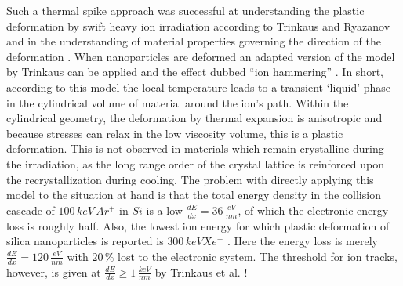 Such a thermal spike approach was successful at understanding the plastic deformation by swift heavy ion irradiation according to Trinkaus and Ryazanov \cite{trinkaus_viscoelastic_1995} and in the understanding of material properties governing the direction of the deformation \cite{hedler_amorphous_2004,hedler_boundary_2005}. When nanoparticles are deformed \cite{snoeks_colloidal_2000,snoeks_colloidal_2001,van_dillen_anisotropic_2001,dillen_energy-dependent_2001,dillen_ion_2003,dillen_ion_2004} an adapted version of the model by Trinkaus can be applied and the effect dubbed ``ion hammering'' \cite{klaumunzer_ion_2004}. In short, according to this model the local temperature leads to a transient `liquid' phase in the cylindrical volume of material around the ion's path. Within the cylindrical geometry, the deformation by thermal expansion is anisotropic and because stresses can relax in the low viscosity volume, this is a plastic deformation. This is not observed in materials which remain crystalline during the irradiation, as the long range order of the crystal lattice is reinforced upon the recrystallization during cooling. The problem with directly applying this model to the situation at hand is that the total energy density in the collision cascade of $100\,keV\,Ar^+$ in $Si$ is a low $\frac{dE}{dx} = 36\,\frac{eV}{nm}$, of which the electronic energy loss is roughly half. Also, the lowest ion energy for which plastic deformation of silica nanoparticles is reported is $300\,keV Xe^+$ \cite{dillen_ion_2003}. Here the energy loss is merely $\frac{dE}{dx} = 120\,\frac{eV}{nm}$ with $20\,\%$ lost to the electronic system. The threshold for ion tracks, however, is given at $\frac{dE}{dx} \geq 1\,\frac{keV}{nm}$ by Trinkaus et al. \cite{trinkaus_viscoelastic_1995}!

